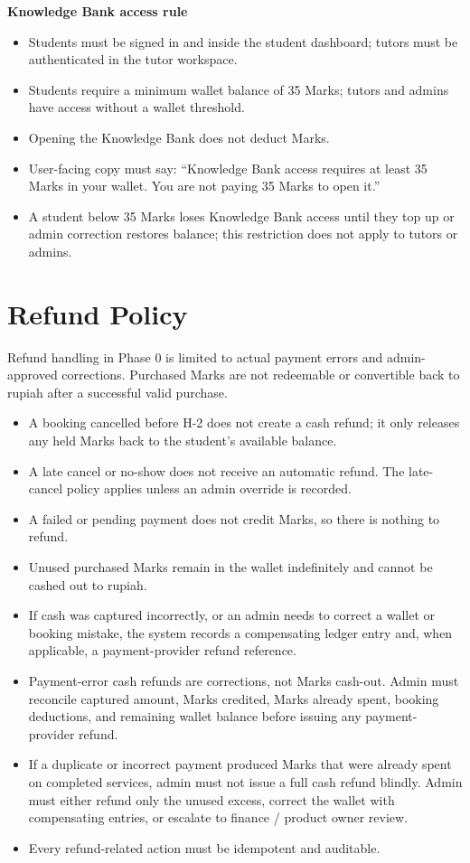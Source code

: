 \documentclass[11pt,a4paper]{article}
\begin{document}
\textbf{Knowledge Bank access rule}
\begin{itemize}
    \item Students must be signed in and inside the student dashboard; tutors must be authenticated in the tutor workspace.
    \item Students require a minimum wallet balance of 35 Marks; tutors and admins have access without a wallet threshold.
    \item Opening the Knowledge Bank does not deduct Marks.
    \item User-facing copy must say: ``Knowledge Bank access requires at least 35 Marks in your wallet. You are not paying 35 Marks to open it.''
    \item A student below 35 Marks loses Knowledge Bank access until they top up or admin correction restores balance; this restriction does not apply to tutors or admins.
\end{itemize}


\section{Refund Policy}

Refund handling in Phase 0 is limited to actual payment errors and admin-approved corrections. Purchased Marks are not redeemable or convertible back to rupiah after a successful valid purchase.

\begin{itemize}
	\item A booking cancelled before H-2 does not create a cash refund; it only releases any held Marks back to the student's available balance.
	\item A late cancel or no-show does not receive an automatic refund. The late-cancel policy applies unless an admin override is recorded.
	\item A failed or pending payment does not credit Marks, so there is nothing to refund.
	\item Unused purchased Marks remain in the wallet indefinitely and cannot be cashed out to rupiah.
	\item If cash was captured incorrectly, or an admin needs to correct a wallet or booking mistake, the system records a compensating ledger entry and, when applicable, a payment-provider refund reference.
	\item Payment-error cash refunds are corrections, not Marks cash-out. Admin must reconcile captured amount, Marks credited, Marks already spent, booking deductions, and remaining wallet balance before issuing any payment-provider refund.
	\item If a duplicate or incorrect payment produced Marks that were already spent on completed services, admin must not issue a full cash refund blindly. Admin must either refund only the unused excess, correct the wallet with compensating entries, or escalate to finance / product owner review.
	\item Every refund-related action must be idempotent and auditable.
\end{itemize}
\end{document}
